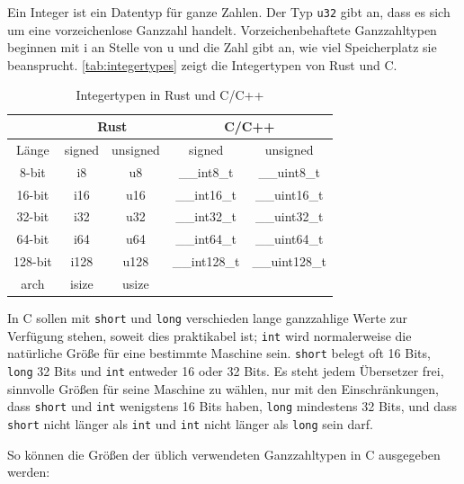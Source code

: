Ein Integer ist ein Datentyp für ganze Zahlen. Der Typ \verb"u32" gibt an, dass es sich um eine vorzeichenlose Ganzzahl handelt. Vorzeichenbehaftete Ganzzahltypen beginnen mit \glqq i\grqq{} an Stelle von \glqq u\grqq{} und die Zahl gibt an, wie viel Speicherplatz sie beansprucht. \autoref{tab:integertypes} zeigt die Integertypen von Rust und C.

\vspace{1cm}

\begin{table}[htbp]
\centering
\begin{tabular}{|c||c|c||c|c|}
\hline
\rule[-1ex]{0pt}{2.5ex} & \multicolumn{2}{|c||}{Rust} & \multicolumn{2}{|c|}{C/C++} \\
\hline
\rule[-1ex]{0pt}{2.5ex} Länge & signed & unsigned & signed & unsigned \\
\hline
\rule[-1ex]{0pt}{2.5ex} 8-bit & i8 & u8 & \_\_int8\_t & \_\_uint8\_t \\
\hline
\rule[-1ex]{0pt}{2.5ex} 16-bit & i16 & u16 & \_\_int16\_t & \_\_uint16\_t \\
\hline
\rule[-1ex]{0pt}{2.5ex} 32-bit & i32 & u32 & \_\_int32\_t & \_\_uint32\_t \\
\hline
\rule[-1ex]{0pt}{2.5ex} 64-bit & i64 & u64 & \_\_int64\_t & \_\_uint64\_t \\
\hline
\rule[-1ex]{0pt}{2.5ex} 128-bit & i128 & u128 & \_\_int128\_t & \_\_uint128\_t \\
\hline
\rule[-1ex]{0pt}{2.5ex} arch & isize & usize & & \\
\hline
\end{tabular}
\caption{Integertypen in Rust und C/C++}
\label{tab:integertypes}
\end{table}

In C sollen mit \verb"short" und \verb"long" verschieden lange ganzzahlige Werte zur Ver\-fü\-gung stehen, soweit dies praktikabel ist; \verb"int" wird normalerweise die natürliche Größe für eine bestimmte Maschine sein. \verb"short" belegt oft 16 Bits, \verb"long" 32 Bits und \verb"int" entweder 16 oder 32 Bits. Es steht jedem Übersetzer frei, sinnvolle Größen für seine Maschine zu wählen, nur mit den Einschränkungen, dass \verb"short" und \verb"int" wenigstens 16 Bits haben, \verb"long" mindestens 32 Bits, und dass \verb"short" nicht länger als \verb"int" und \verb"int" nicht länger als \verb"long" sein darf. \cite{ProgInC}

So können die Größen der üblich verwendeten Ganzzahltypen in C ausgegeben werden:

